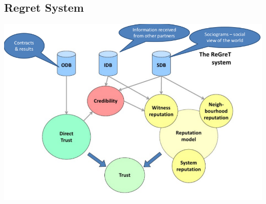 \documentclass{article} %
\begin{document}
	\subsection{Regret System}
	\begin{center}
		\includegraphics[scale=0.3]{img/regret.png}
	\end{center}
\end{document}

